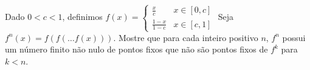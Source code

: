 Dado \( 0< c< 1\), definimos $f(x) =
 \begin{cases}
 \frac{x}{c} & x  \in [0,c] \\
 \frac{1-x}{1-c} & x \in [c, 1]
\end{cases}   
$
Seja \(f^{n}(x)=f(f(\dots f(x)))\). Mostre que para cada inteiro positivo \(n\), \(f^{n}\) possui um número finito não nulo de pontos fixos que não são pontos fixos de \(f^k\) para \(k<   n\).
